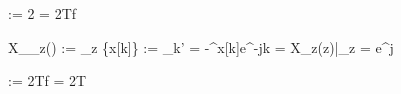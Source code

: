 \begin{abox}
	\Omega := 2\pi{} = 2\pi Tf
\end{abox}

\begin{abox}
	X_{_z}(\Omega) := _z \{x[k]\} := \sum_{k' = -\infty}^{\infty}x[k]e^{-j\Omega k} = X_z(z)|_{z = e^{j\Omega}}
\end{abox}

\begin{abox}
	\Omega := 2\pi Tf   = 2\pi T
\end{abox}
















